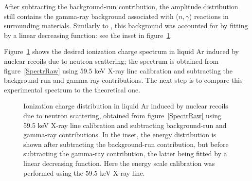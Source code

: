 \documentclass[a4paper,11pt]{article}
\begin{document}
After subtracting the background-run contribution, the amplitude distribution still contains the gamma-ray background associated with ($n,\gamma$) reactions in surrounding materials. Similarly to  \cite{IonYield14}, this background was accounted for by fitting by a linear decreasing function: see the inset in figure~\ref{SpectrNeutron}.

Figure~\ref{SpectrNeutron} shows the desired ionization charge
spectrum in liquid Ar induced by nuclear recoils due to neutron
scattering; the spectrum is obtained from figure~\ref{SpectrRaw} using 59.5 keV X-ray line calibration and subtracting the background-run and gamma-ray contributions. The next step is to compare this experimental spectrum to the theoretical one.
\begin{figure}[ht]
	\caption{Ionization charge distribution in liquid Ar induced by nuclear recoils due to neutron scattering, obtained from figure~\ref{SpectrRaw} using 59.5 keV X-ray line calibration and subtracting background-run and gamma-ray contributions. In the inset, the energy distribution is shown after subtracting the background-run contribution, but before subtracting the gamma-ray contribution, the latter being fitted by a linear decreasing function. Here the energy scale calibration was performed using the 59.5 keV X-ray line.}
	\label{SpectrNeutron}
\end{figure}
\end{document}
